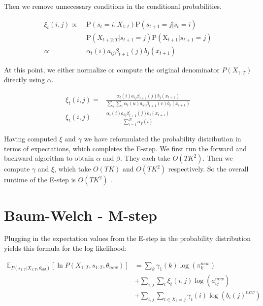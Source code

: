 Then we remove unnecessary conditions in the conditional probabilities.

\begin{equation}
\begin{aligned}
\xi_{t}(i, j) \propto \; &\mathrm{P}\left(s_{t}=i, X_{1: t}\right) \mathrm{P}\left(s_{t+1}=j | s_{t}=i\right) \\
&\mathrm{P}\left(X_{t+2: T} | s_{t+1}=j\right) \mathrm{P}\left(\mathrm{X}_{t+1} | s_{t+1}=j\right) \\
\propto \;  & \alpha_{t}(i) a_{i j} \beta_{t+1}(j) b_{j}(x_{t+1})
\end{aligned} 
\end{equation}

At this point, we either normalize or compute the original denominator $P(X_{1:T})$ directly using $\alpha$.

\begin{equation}
\begin{aligned}
\xi_{t}(i, j)=&\frac{\alpha_{t}(i) a_{i j} \beta_{t+1}(j) b_{j}(x_{t+1})}{\sum_{u} \sum_{v} \alpha_{t}(u) a_{u v} \beta_{t+1}(v) b_{v}( x_{t+1})} \\
\xi_{t}(i, j)=&\frac{\alpha_{t}(i) a_{i j} \beta_{t+1}(j) b_{j} (x_{t+1})}{\sum_{i=1}^{N} \alpha_{T}(i)}
\label{eq:xi-def}
\end{aligned}
\end{equation}

Having computed $\xi$ and $\gamma$ we have reformulated the probability distribution in terms of expectations, which completes the E-step. We first run the forward and backward algorithm to obtain $\alpha$ and $\beta$. They each take $O(TK^2)$. Then we compute $\gamma$ and $\xi$, which take $O(TK)$ and $O(TK^2)$ respectively. So the overall runtime of the E-step is $O(TK^2)$ \parencite{miningmassivedatasets}.

\section{Baum-Welch - M-step}

Plugging in the expectation values from the E-step in the probability distribution yields this formula for the log likelihood:

\begin{equation}
\begin{aligned}
\mathbb{E}_{P\left(s_{1: T} | X_{1: T}, \theta_{o l d}\right)}\left[\ln P\left(X_{1: T}, s_{1: T}, \theta_{n e w}\right)\right] &=\sum_{k} \gamma_{1}(k) \log \left(\pi_{k}^{n e w}\right) \\
&+\sum_{i, j} \sum_{t} \xi_{t}(i, j) \log \left(a_{i j}^{n e w}\right) \\
&+\sum_{i, j} \sum_{t \in X_t = j} \gamma_{t}(i)   \log \left(b_{i}(j)^{n e w}\right)
\end{aligned}
\end{equation}

